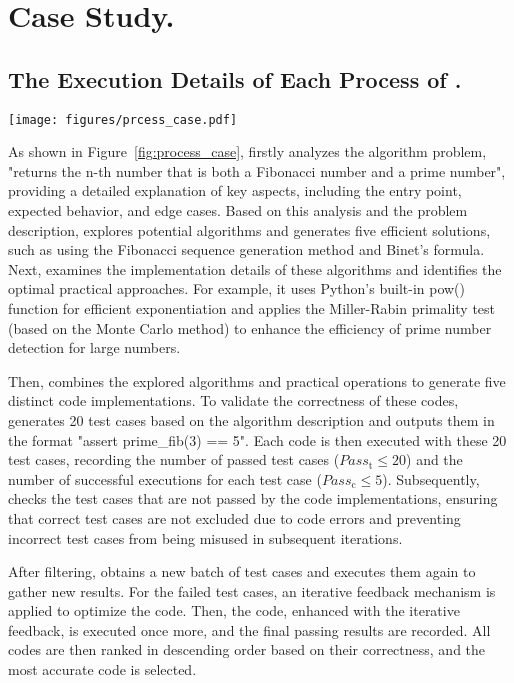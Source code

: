 \section{Case Study.}
\label{appendix-casestudy}
\subsection{The Execution Details of Each Process of \tool.}
\begin{figure*}[t]
    \centering
    \texttt{[image: figures/prcess\_case.pdf]}
    \caption{The figure illustrates the specific output of each subtask process of \tool in solving algorithm problems.}
    \label{fig:process_case}
\end{figure*}

As shown in Figure~\ref{fig:process_case}, \tool firstly analyzes the algorithm problem, "returns the n-th number that is both a Fibonacci number and a prime number", providing a detailed explanation of key aspects, including the entry point, expected behavior, and edge cases. Based on this analysis and the problem description, \tool explores potential algorithms and generates five efficient solutions, such as using the Fibonacci sequence generation method and Binet’s formula. Next, \tool examines the implementation details of these algorithms and identifies the optimal practical approaches. For example, it uses Python’s built-in pow() function for efficient exponentiation and applies the Miller-Rabin primality test (based on the Monte Carlo method) to enhance the efficiency of prime number detection for large numbers.

Then, \tool combines the explored algorithms and practical operations to generate five distinct code implementations. To validate the correctness of these codes, \tool generates 20 test cases based on the algorithm description and outputs them in the format "assert prime\_fib(3) == 5". Each code is then executed with these 20 test cases, recording the number of passed test cases ($Pass_{\text{t}} \leq 20$) and the number of successful executions for each test case ($Pass_{\text{c}} \leq 5$). Subsequently, \tool checks the test cases that are not passed by the code implementations, ensuring that correct test cases are not excluded due to code errors and preventing incorrect test cases from being misused in subsequent iterations.

After filtering, \tool obtains a new batch of test cases and executes them again to gather new results. For the failed test cases, an iterative feedback mechanism is applied to optimize the code. Then, the code, enhanced with the iterative feedback, is executed once more, and the final passing results are recorded. All codes are then ranked in descending order based on their correctness, and the most accurate code is selected. 

